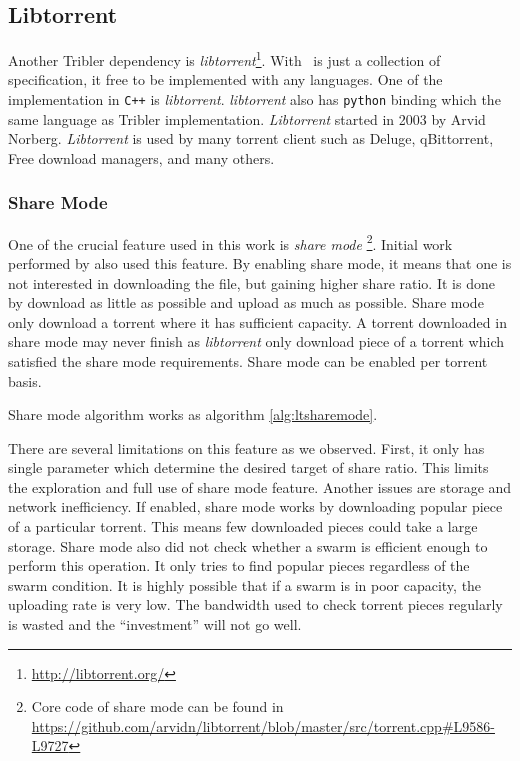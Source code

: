 \subsection{Libtorrent}
Another Tribler dependency is \textit{libtorrent}\footnote{\url{http://libtorrent.org/}}. With \bt~is just a collection of specification, it free to be implemented with any languages. One of the implementation in \texttt{C++} is \textit{libtorrent}. \textit{libtorrent} also has \texttt{python} binding which the same language as Tribler implementation. \textit{Libtorrent} started in 2003 by Arvid Norberg. \textit{Libtorrent} is used by many torrent client such as Deluge, qBittorrent, Free download managers, and many others.

\subsubsection{Share Mode}
One of the crucial feature used in this work is \textit{share mode} \footnote{Core code of share mode can be found in \url{https://github.com/arvidn/libtorrent/blob/master/src/torrent.cpp\#L9586-L9727}}. Initial work performed by \citeauthor{2015:creditmining:capota} also used this feature\cite{2015:creditmining:capota}. By enabling share mode, it means that one is not interested in downloading the file, but gaining higher share ratio. It is done by download as little as possible and upload as much as possible. Share mode only download a torrent where it has sufficient capacity. A torrent downloaded in share mode may never finish as \textit{libtorrent} only download piece of a torrent which satisfied the share mode requirements. Share mode can be enabled per torrent basis.

Share mode algorithm works as algorithm \ref{alg:ltsharemode}.

There are several limitations on this feature as we observed. First, it only has single parameter which determine the desired target of share ratio. This limits the exploration and full use of share mode feature. Another issues are storage and network inefficiency. If enabled, share mode works by downloading popular piece of a particular torrent. This means few downloaded pieces could take a large storage. Share mode also did not check whether a swarm is efficient enough to perform this operation. It only tries to find popular pieces regardless of the swarm condition. It is highly possible that if a swarm is in poor capacity, the uploading rate is very low. The bandwidth used to check torrent pieces regularly is wasted and the ``investment'' will not go well.

